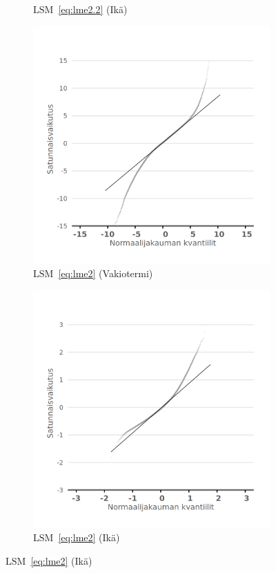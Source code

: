 \documentclass[finnish]{docopts}
\begin{document}
\begin{figure}[H]
\begin{subfigure}[b]{0.4\textwidth}
  \caption{$\text{LSM}$~\ref{eq:lme2.2} (Ikä)}
  \label{fig:lme_krit_ika_qq}
\end{subfigure}
\begin{subfigure}[b]{0.4\textwidth}
\centering
  \includegraphics[width=.8\linewidth]{kuvaajat/lme3_full_qq_ranef_int.png}
  \caption{$\text{LSM}$~\ref{eq:lme2} (Vakiotermi)}
  \label{fig:lme_taysi_int_qq}
\end{subfigure}%
\begin{subfigure}[b]{0.4\textwidth}
\centering
  \includegraphics[width=.8\linewidth]{kuvaajat/lme3_full_qq_ranef_ika.png}
  \caption{$\text{LSM}$~\ref{eq:lme2} (Ikä)}

\end{subfigure}
\end{figure}
\end{document}
